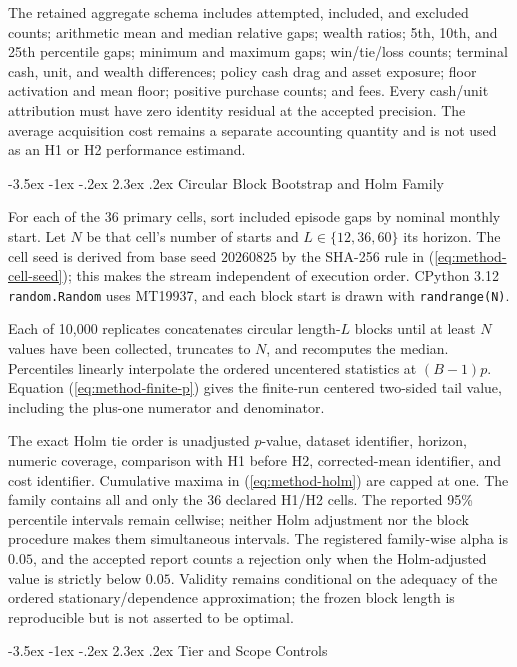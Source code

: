 \documentclass[12pt,a4paper,oneside]{report}
\makeatletter
\renewcommand\section{\@startsection{section}{1}{\z@}%
  {-3.5ex \@plus -1ex \@minus -.2ex}%
  {2.3ex \@plus .2ex}%
  {\normalfont\fontsize{14}{17}\selectfont\bfseries}}
\makeatother
\begin{document}
The retained aggregate schema includes attempted, included, and excluded
counts; arithmetic mean and median relative gaps; wealth ratios; 5th, 10th,
and 25th percentile gaps; minimum and maximum gaps; win/tie/loss counts;
terminal cash, unit, and wealth differences; policy cash drag and asset
exposure; floor activation and mean floor; positive purchase counts; and fees.
Every cash/unit attribution must have zero identity residual at the accepted
precision. The average acquisition cost remains a separate accounting quantity
and is not used as an H1 or H2 performance estimand.

\section{Circular Block Bootstrap and Holm Family}
\label{sec:appendix-bootstrap-holm}

For each of the 36 primary cells, sort included episode gaps by nominal monthly
start. Let $N$ be that cell's number of starts and $L\in\{12,36,60\}$ its
horizon. The cell seed is derived from base seed $20260825$ by the SHA-256 rule
in (\ref{eq:method-cell-seed}); this makes the stream independent of execution
order. CPython 3.12 \texttt{random.Random} uses MT19937, and each block start
is drawn with \texttt{randrange(N)}.

Each of 10,000 replicates concatenates circular length-$L$ blocks until at
least $N$ values have been collected, truncates to $N$, and recomputes the
median. Percentiles linearly interpolate the ordered uncentered statistics at
$(B-1)p$. Equation (\ref{eq:method-finite-p}) gives the finite-run centered
two-sided tail value, including the plus-one numerator and denominator.

The exact Holm tie order is unadjusted $p$-value, dataset identifier, horizon,
numeric coverage, comparison with H1 before H2, corrected-mean identifier, and
cost identifier. Cumulative maxima in (\ref{eq:method-holm}) are capped at one.
The family contains all and only the 36 declared H1/H2 cells. The reported 95\%
percentile intervals remain cellwise; neither Holm adjustment nor the block
procedure makes them simultaneous intervals. The registered family-wise alpha
is $0.05$, and the accepted report counts a rejection only when the
Holm-adjusted value is strictly below $0.05$. Validity remains conditional on
the adequacy of the ordered stationary/dependence approximation; the frozen
block length is reproducible but is not asserted to be optimal.

\section{Tier and Scope Controls}
\label{sec:appendix-tier-scope}
\end{document}
